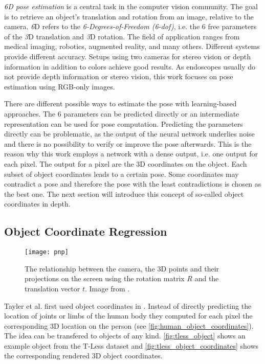 \textit{6D pose estimation} is a central task in the computer vision community. The goal is to retrieve an object's translation and rotation from an image, relative to the camera. \textit{6}D refers to the \textit{6-Degrees-of-Freedom (6-\gls{dof})}, i.e. the 6 free parameters of the \textit{3}D translation and \textit{3}D rotation. The field of application ranges from medical imaging, robotics, augmented reality, and many others. Different systems provide different accuracy. Setups using two cameras for stereo vision or depth information in addition to colors achieve good results. As endoscopes usually do not provide depth information or stereo vision, this work focuses on pose estimation using RGB-only images.

There are different possible ways to estimate the pose with learning-based approaches. The 6 parameters can be predicted directly or an intermediate representation can be used for pose computation. Predicting the parameters directly can be problematic, as the output of the neural network underlies noise and there is no possibility to verify or improve the pose afterwards. This is the reason why this work employs a network with a dense output, i.e. one output  for each pixel. The output for a pixel are the 3D coordinates on the object. Each subset of object coordinates leads to a certain pose. Some coordinates may contradict a pose and therefore the pose with the least contradictions is chosen as the best one. The next section will introduce this concept of so-called object coordinates in depth.

\subsection{Object Coordinate Regression} \label{objectcoordinates}

\begin{figure}[!tbp]
	\centering
    \texttt{[image: pnp]}
    \caption{The relationship between the camera, the 3D points and their projections on the screen using the rotation matrix $R$ and the translation vector $t$. Image from \cite{opencv_pnp}.}
    	\label{fig:pnp}
\end{figure} 

Tayler et al. first used object coordinates in \cite{tsharp}. Instead of directly predicting the location of joints or limbs of the human body they computed for each pixel the corresponding 3D location on the person (see \fig \ref{fig:human_object_coordinates}). The idea can be transfered to objects of any kind. \fig \ref{fig:tless_object} shows an example object from the T-Less dataset \cite{tless} and \fig \ref{fig:tless_object_coordinates} shows the corresponding rendered 3D object coordinates.


